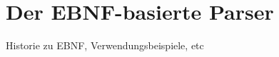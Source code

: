 \chapter{Der EBNF-basierte Parser}
\label{chap:theory:ebnf}

Historie zu EBNF, Verwendungsbeispiele, etc

